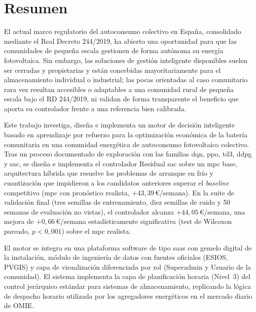 \documentclass[12pt, a4paper, twoside]{report}
\begin{document}



\setcounter{page}{1}

\chapter*{Resumen}
\thispagestyle{plain}

El actual marco regulatorio del autoconsumo colectivo en España, consolidado
mediante el Real Decreto 244/2019, ha abierto una oportunidad para que las
comunidades de pequeña escala gestionen de forma autónoma su energía
fotovoltaica. Sin embargo, las soluciones de gestión inteligente disponibles
suelen ser cerradas y propietarias y están concebidas mayoritariamente para el
almacenamiento individual o industrial; las pocas orientadas al caso comunitario
rara vez resultan accesibles o adaptables a una comunidad rural de pequeña
escala bajo el RD 244/2019, ni validan de forma transparente el beneficio que
aporta su controlador frente a una referencia bien calibrada.

Este trabajo investiga, diseña e implementa un motor de decisión inteligente
basado en aprendizaje por refuerzo para la optimización económica de la batería
comunitaria en una comunidad energética de autoconsumo fotovoltaico colectivo.
Tras un proceso documentado de exploración con las familias \acrshort{dqn},
\acrshort{ppo}, \acrshort{td3}, \acrshort{ddpg} y \acrshort{sac}, se diseña e implementa el
controlador Residual \acrshort{sac} sobre un \acrshort{mpc} base, arquitectura
híbrida que resuelve los problemas de arranque en frío y cuantización que
impidieron a los candidatos anteriores superar el \textit{baseline} competitivo
(\acrshort{mpc} con pronóstico realista, $+43{,}39$\,€/semana). En la suite de
validación final (tres semillas de entrenamiento, diez semillas de ruido y 50
semanas de evaluación no vistas), el controlador alcanza $+44{,}05$\,€/semana,
una mejora de $+0{,}66$\,€/semana estadísticamente significativa (test de
Wilcoxon pareado, $p<0{,}001$) sobre el \acrshort{mpc} realista.

El motor se integra en una plataforma software de tipo \acrshort{saas} con
gemelo digital de la instalación, módulo de ingeniería de datos con fuentes
oficiales (ESIOS, PVGIS) y capa de visualización diferenciada por rol
(Superadmin y Usuario de la comunidad). El sistema implementa la capa de
planificación horaria (Nivel~3) del control jerárquico estándar para sistemas
de almacenamiento, replicando la lógica de despacho horario utilizada por
los agregadores energéticos en el mercado diario de OMIE.
\end{document}
